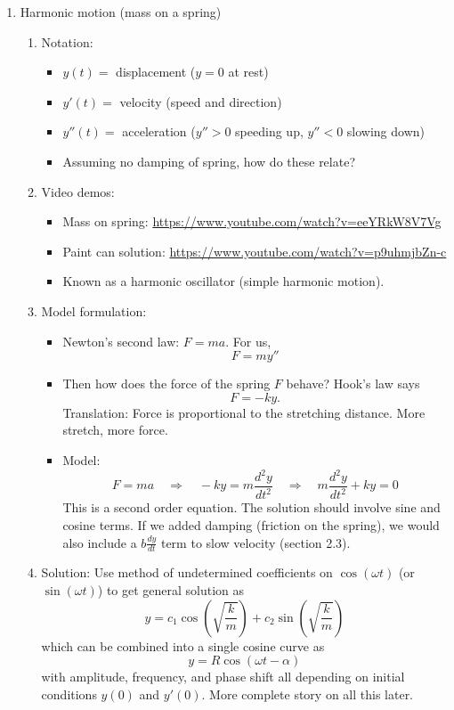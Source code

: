 \documentclass{article}
\begin{document}
\begin{enumerate}
\item Harmonic motion (mass on a spring)
\begin{enumerate}
\item Notation: 
\begin{itemize}
\item $y(t)=$ displacement ($y=0$ at rest)
\item $y'(t)=$ velocity (speed and direction)
\item $y''(t)=$ acceleration ($y''>0$ speeding up, $y''<0$ slowing down) 
\item Assuming no damping of spring, how do these relate?
\end{itemize}
\item Video demos:
\begin{itemize}
\item Mass on spring: \url{https://www.youtube.com/watch?v=eeYRkW8V7Vg}
\item Paint can solution: \url{https://www.youtube.com/watch?v=p9uhmjbZn-c}
\item Known as a harmonic oscillator (simple harmonic motion).
\end{itemize}
\item Model formulation: 
\begin{itemize}
\item Newton's second law: $F=ma$. For us,
\[
F = my''
\]
\item Then how does the force of the spring $F$ behave? Hook's law says
\[
F = -ky.
\]
Translation: Force is proportional to the stretching distance. More stretch, more force.
\item Model:
\[
F=ma \quad \Rightarrow \quad -ky = m\frac{d^2y}{dt^2} 
\quad \Rightarrow \quad m\frac{d^2y}{dt^2}+ky = 0
\]
This is a second order equation. The solution should involve sine and cosine terms. If we added damping (friction on the spring), we would also include a $b\frac{dy}{dt}$ term to slow velocity (section 2.3).
\end{itemize}
\item Solution: Use method of undetermined coefficients on $\cos(\omega t)$ (or $\sin(\omega t)$) to get general solution as
\[
y = c_1 \cos\left (\sqrt{\frac{k}{m}}\right) + c_2 \sin\left (\sqrt{\frac{k}{m}}\right)
\]
which can be combined into a single cosine curve as
\[
y = R\cos(\omega t - \alpha)
\]
with amplitude, frequency, and phase shift all depending on initial conditions $y(0)$ and $y'(0)$. More complete story on all this later.

\end{enumerate}
\end{enumerate}
\end{document}
